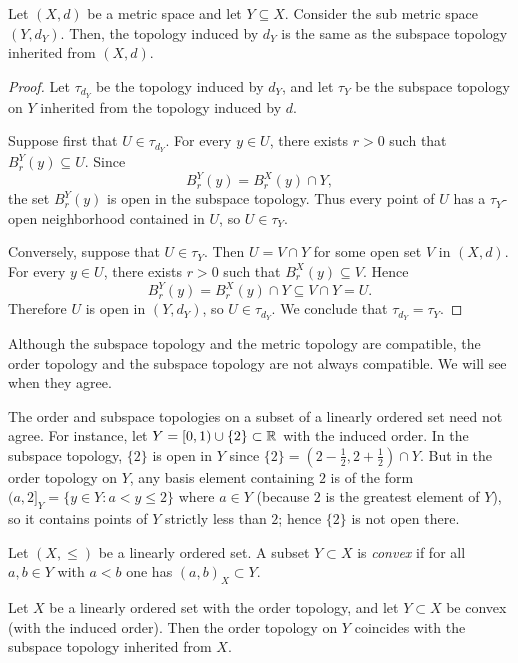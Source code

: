 \begin{theorem}
  Let $(X,d)$ be a metric space and let $Y\subseteq X$. Consider the sub metric space $(Y,d_Y)$. Then, the topology induced by $d_Y$ is the same as the subspace topology inherited from $(X,d)$.
\end{theorem}
\begin{proof}
  Let $\tau_{d_Y}$ be the topology induced by $d_Y$, and let $\tau_Y$ be the subspace topology on $Y$ inherited from the topology induced by $d$.

  Suppose first that $U\in\tau_{d_Y}$. For every $y\in U$, there exists $r>0$ such that $B_r^Y(y)\subseteq U$. Since
  \[
    B_r^Y(y)=B_r^X(y)\cap Y,
  \]
  the set $B_r^Y(y)$ is open in the subspace topology. Thus every point of $U$ has a $\tau_Y$-open neighborhood contained in $U$, so $U\in\tau_Y$.

  Conversely, suppose that $U\in\tau_Y$. Then $U=V\cap Y$ for some open set $V$ in $(X,d)$. For every $y\in U$, there exists $r>0$ such that $B_r^X(y)\subseteq V$. Hence
  \[
    B_r^Y(y)=B_r^X(y)\cap Y\subseteq V\cap Y=U.
  \]
  Therefore $U$ is open in $(Y,d_Y)$, so $U\in\tau_{d_Y}$. We conclude that $\tau_{d_Y}=\tau_Y$.
\end{proof}




Although the subspace topology and the metric topology are compatible, the order topology and the subspace topology are not always compatible. We will see when they agree.

\begin{remark}
The order and subspace topologies on a subset of a linearly ordered set need not agree.  
For instance, let \(Y=[0,1)\cup\{2\}\subset\mathbb{R}\) with the induced order.  
In the subspace topology, \(\{2\}\) is open in \(Y\) since \(\{2\}=(2-\tfrac12, 2+\tfrac12) \cap Y\).  
But in the order topology on \(Y\), any basis element containing \(2\) is of the form
\((a,2]_Y=\{y\in Y:a<y\le 2\}\) where $a\in Y$ (because \(2\) is the greatest element of \(Y\)),  
so it contains points of \(Y\) strictly less than \(2\); hence \(\{2\}\) is not open there.
\end{remark}

\begin{definition}
Let \((X,\le)\) be a linearly ordered set. A subset \(Y\subset X\) is \emph{convex} if for all
\(a,b\in Y\) with \(a<b\) one has \((a,b)_X\subset Y\).
\end{definition}

\begin{theorem}
Let \(X\) be a linearly ordered set with the order topology, and let \(Y\subset X\) be convex (with the induced order). Then the order topology on \(Y\) coincides with the subspace topology inherited from \(X\).
\end{theorem}

